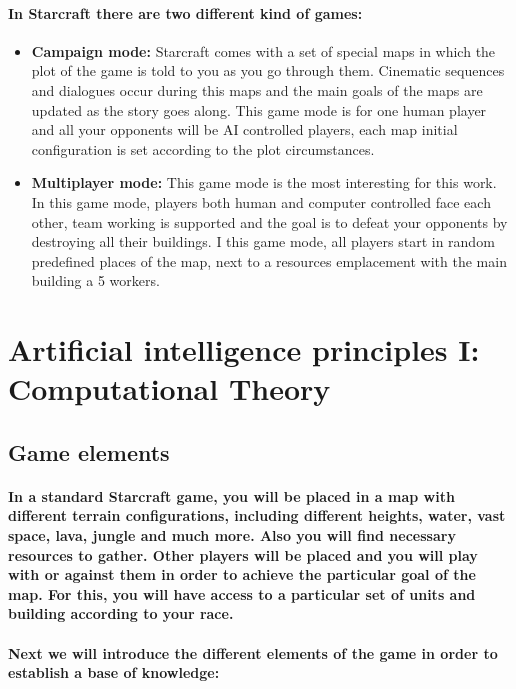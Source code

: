 \documentclass[a4paper,10pt]{article}
\newcommand{\p}[1]{\paragraph{\indent\textnormal{#1}}}
\begin{document}
    \p{In Starcraft there are two different kind of games:}

    \begin{itemize}
     \item \textbf{Campaign mode:} Starcraft comes with a set of special maps in which the plot of the game is told to you as you go through them. Cinematic sequences and dialogues occur during this maps and the main goals of the maps are updated as the story goes along. This game mode is for one human player and all your opponents will be AI controlled players, each map initial configuration is set according to the plot circumstances.

    \item \textbf{Multiplayer mode:} This game mode is the most interesting for this work. In this game mode, players both human and computer controlled face each other, team working is supported and the goal is to defeat your opponents by destroying all their buildings. I this game mode, all players start in random predefined places of the map, next to a resources emplacement with the main building a 5 workers.
    \end{itemize}


\newpage
\section{Artificial intelligence principles I: Computational Theory}

  \subsection{Game elements}

    \p{In a standard Starcraft game, you will be placed in a map with different terrain configurations, including different heights, water, vast space, lava, jungle and much more. Also you will find necessary resources to gather. Other players will be placed and you will play with or against them in order to achieve the particular goal of the map. For this, you will have access to a particular set of units and building according to your race.}

    \p{Next we will introduce the different elements of the game in order to \textbf{establish a base of knowledge}:}
\end{document}
